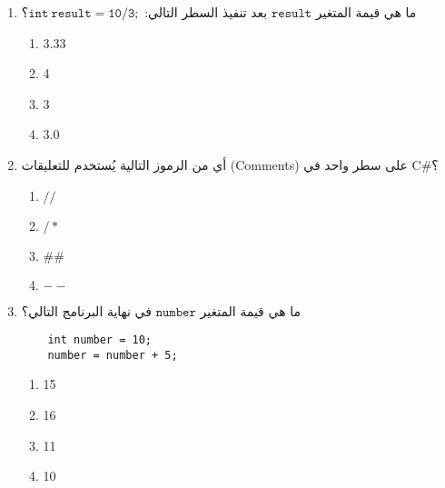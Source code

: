 \documentclass[12pt]{article}
\begin{document}
\begin{enumerate}
    \item ما هي قيمة المتغير $\mathtt{result}$ بعد تنفيذ السطر التالي: $\mathtt{int\ result = 10 / 3;}$؟ %
    \begin{enumerate}
        \item 3.33
        \item 4
        \item 3
        \item 3.0
    \end{enumerate}

    \item أي من الرموز التالية يُستخدم للتعليقات (Comments) على سطر واحد في C\#؟
    \begin{enumerate}
        \item $\mathtt{//}$
        \item $\mathtt{/*}$
        \item $\mathtt{\#\#}$
        \item $\mathtt{--}$
    \end{enumerate}

    \item ما هي قيمة المتغير $\mathtt{number}$ في نهاية البرنامج التالي؟
    \begin{english}
    \begin{lstlisting}
    int number = 10;
    number = number + 5;
    \end{lstlisting}
    \end{english}
    \begin{enumerate}
        \item 15
        \item 16
        \item 11
        \item 10
    \end{enumerate}

\end{enumerate}
\end{document}

